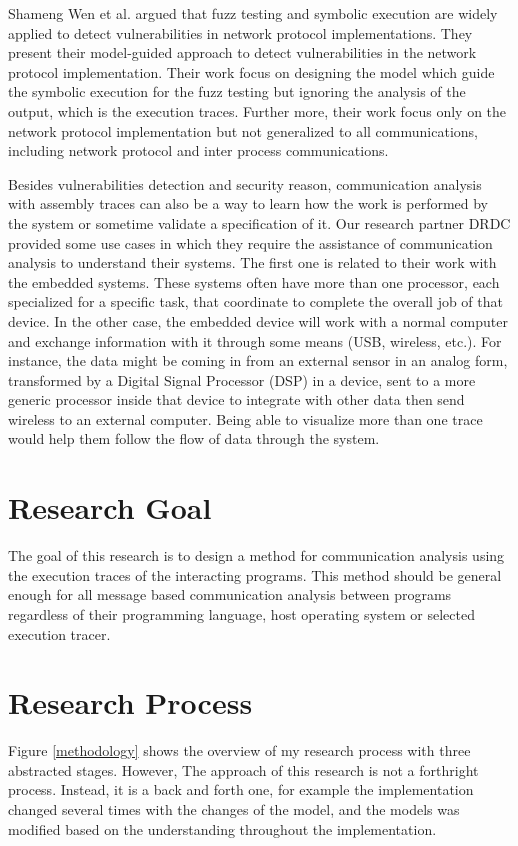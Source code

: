 Shameng Wen et al. argued that fuzz testing and symbolic execution are widely applied to detect vulnerabilities in network protocol implementations. They present their model-guided approach to detect vulnerabilities in the network protocol implementation. Their work focus on designing the model which guide the symbolic execution for the fuzz testing but ignoring the analysis of the output, which is the execution traces. \cite{wen2017model} Further more, their work focus only on the network protocol implementation but not generalized to all communications, including network protocol and inter process communications.

Besides vulnerabilities detection and security reason, communication analysis with assembly traces can also be a way to learn how the work is performed by the system or sometime validate a specification of it. Our research partner DRDC provided some use cases in which they require the assistance of communication analysis to understand their systems. The first one is related to their work with the embedded systems. These systems often have more than one processor, each specialized for a specific task, that coordinate to complete the overall job of that device.  In the other case, the embedded device will work with a normal computer and exchange information with it through some means
(USB, wireless, etc.).  For instance, the data might be coming in from an external sensor in an analog form, transformed by a Digital Signal Processor (DSP) in a device, sent to a more generic processor inside that device to integrate with other data then send wireless to an external computer. Being able to visualize more than one trace would help them follow the flow of data through the system.

\section{Research Goal}
The goal of this research is to design a method for communication analysis using the execution traces of the interacting programs. This method should be general enough for all message based communication analysis between programs regardless of their programming language, host operating system or selected execution tracer. 

\section{Research Process}
Figure \ref{methodology} shows the overview of my research process with three abstracted stages. However, The approach of this research is not a forthright process. Instead, it is a back and forth one, for example the implementation changed several times with the changes of the model, and the models was modified based on the understanding throughout the implementation. 

